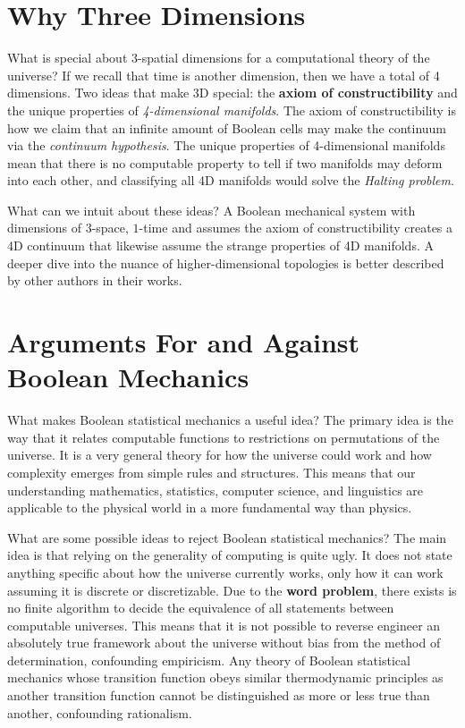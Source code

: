 \documentclass[10pt, a5paper, twoside, openright]{memoir}
\begin{document}
\section{Why Three Dimensions}
What is special about $3$-spatial dimensions for a computational theory of the universe? If we recall that time is another dimension, then we have a total of 4 dimensions. Two ideas that make 3D special: the \textbf{axiom of constructibility} and the unique properties of \textit{4-dimensional manifolds}. The axiom of constructibility is how we claim that an infinite amount of Boolean cells may make the continuum via the \textit{continuum hypothesis}. The unique properties of 4-dimensional manifolds mean that there is no computable property to tell if two manifolds may deform into each other, and classifying all 4D manifolds would solve the \textit{Halting problem}.

What can we intuit about these ideas? A Boolean mechanical system with dimensions of $3$-space, $1$-time and assumes the axiom of constructibility creates a 4D continuum that likewise assume the strange properties of 4D manifolds. A deeper dive into the nuance of higher-dimensional topologies is better described by other authors in their works.

\section{Arguments For and Against Boolean Mechanics}
What makes Boolean statistical mechanics a useful idea? The primary idea is the way that it relates computable functions to restrictions on permutations of the universe. It is a very general theory for how the universe could work and how complexity emerges from simple rules and structures. This means that our understanding mathematics, statistics, computer science, and linguistics are applicable to the physical world in a more fundamental way than physics.

What are some possible ideas to reject Boolean statistical mechanics? The main idea is that relying on the generality of computing is quite ugly. It does not state anything specific about how the universe currently works, only how it can work assuming it is discrete or discretizable. Due to the \textbf{word problem}, there exists is no finite algorithm to decide the equivalence of all statements between computable universes. This means that it is not possible to reverse engineer an absolutely true framework about the universe without bias from the method of determination, confounding empiricism. Any theory of Boolean statistical mechanics whose transition function obeys similar thermodynamic principles as another transition function cannot be distinguished as more or less true than another, confounding rationalism. 
\end{document}
